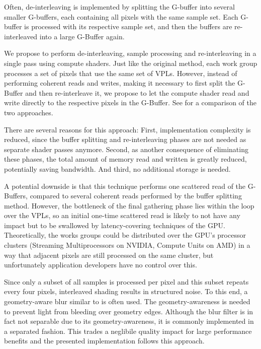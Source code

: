 Often, de-interleaving is implemented by splitting the G-buffer into several smaller G-buffers, each containing all pixels with the same sample set. Each G-buffer is processed with its respective sample set, and then the buffers are re-interleaved into a large G-Buffer again.

We propose to perform de-interleaving, sample processing and re-interleaving in a single pass using compute shaders. Just like the original method, each work group processes a set of pixels that use the same set of VPLs. However, instead of performing coherent reads and writes, making it necessary to first split the G-Buffer and then re-interleave it, we propose to let the compute shader read and write directly to the respective pixels in the G-Buffer. See  for a comparison of the two approaches.


There are several reasons for this approach: First, implementation complexity is reduced, since the buffer splitting and re-interleaving phases are not needed as separate shader passes anymore. Second, as another consequence of eliminating these phases, the total amount of memory read and written is greatly reduced, potentially saving bandwidth. And third, no additional storage is needed.

A potential downside is that this technique performs one scattered read of the G-Buffers, compared to several coherent reads performed by the buffer splitting method. However, the bottleneck of the final gathering phase lies within the loop over the VPLs, so an initial one-time scattered read is likely to not have any impact but to be swallowed by latency-covering techniques of the GPU. Theoretically, the works groups could be distributed over the GPU's processor clusters (Streaming Multiprocessors on NVIDIA, Compute Units on AMD) in a way that adjacent pixels are still processed on the same cluster, but unfortunately application developers have no control over this.

Since only a subset of all samples is processed per pixel and this subset repeats every four pixels, interleaved shading results in structured noise. To this end, a geometry-aware blur similar to \citet{laine2007incremental} is often used. The geometry-awareness is needed to prevent light from bleeding over geometry edges. Although the blur filter is in fact not separable due to its geometry-awareness, it is commonly implemented in a separated fashion. This trades a neglibile quality impact for large performance benefits and the presented implementation follows this approach.


